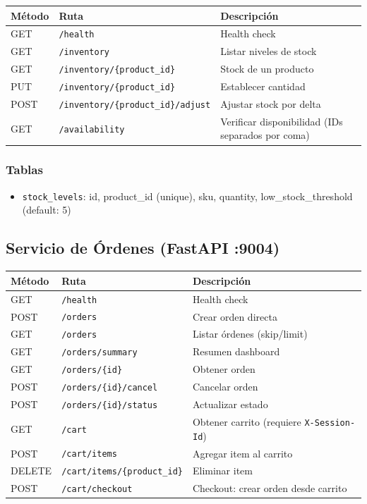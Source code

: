\documentclass[11pt,a4paper]{article}
\begin{document}
\begin{tabularx}{\textwidth}{|l|X|l|}
\hline
\textbf{Método} & \textbf{Ruta} & \textbf{Descripción} \\
\hline
GET & \texttt{/health} & Health check \\
GET & \texttt{/inventory} & Listar niveles de stock \\
GET & \texttt{/inventory/\{product\_id\}} & Stock de un producto \\
PUT & \texttt{/inventory/\{product\_id\}} & Establecer cantidad \\
POST & \texttt{/inventory/\{product\_id\}/adjust} & Ajustar stock por delta \\
GET & \texttt{/availability} & Verificar disponibilidad (IDs separados por coma) \\
\hline
\end{tabularx}

\subsubsection{Tablas}
\begin{itemize}
    \item \texttt{stock\_levels}: id, product\_id (unique), sku, quantity, low\_stock\_threshold (default: 5)
\end{itemize}

\subsection{Servicio de Órdenes (FastAPI :9004)}

\begin{tabularx}{\textwidth}{|l|X|l|}
\hline
\textbf{Método} & \textbf{Ruta} & \textbf{Descripción} \\
\hline
GET & \texttt{/health} & Health check \\
POST & \texttt{/orders} & Crear orden directa \\
GET & \texttt{/orders} & Listar órdenes (skip/limit) \\
GET & \texttt{/orders/summary} & Resumen dashboard \\
GET & \texttt{/orders/\{id\}} & Obtener orden \\
POST & \texttt{/orders/\{id\}/cancel} & Cancelar orden \\
POST & \texttt{/orders/\{id\}/status} & Actualizar estado \\
\hline
GET & \texttt{/cart} & Obtener carrito (requiere \texttt{X-Session-Id}) \\
POST & \texttt{/cart/items} & Agregar item al carrito \\
DELETE & \texttt{/cart/items/\{product\_id\}} & Eliminar item \\
POST & \texttt{/cart/checkout} & Checkout: crear orden desde carrito \\
\hline
\end{tabularx}
\end{document}
